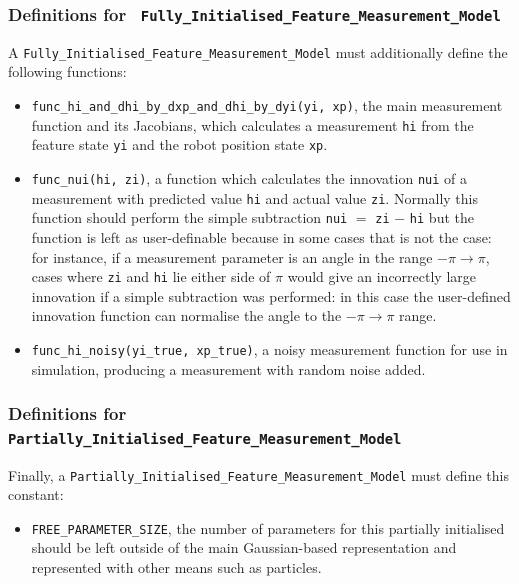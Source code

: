\documentclass{article}
\begin{document}
\subsubsection{Definitions for {\tt
    Fully\_Initialised\_Feature\_Measurement\_Model}}

A {\tt Fully\_Initialised\_Feature\_Measurement\_Model} must
additionally define the following functions: 
\begin{itemize}
\item {\tt func\_hi\_and\_dhi\_by\_dxp\_and\_dhi\_by\_dyi(yi, xp)},
  the main measurement function and its Jacobians, which calculates a
  measurement {\tt hi} from the feature state {\tt yi} and the robot
  position state {\tt xp}.
\item {\tt func\_nui(hi, zi)}, a function which calculates the
  innovation {\tt nui} of a measurement with predicted value {\tt hi}
  and actual value {\tt zi}. Normally this function should perform the
  simple subtraction {\tt nui} $=$ {\tt zi} $-$ {\tt hi} but the
  function is left as user-definable because in some cases that is not
  the case: for instance, if a measurement parameter is an angle in
  the range $-\pi \rightarrow \pi$, cases where {\tt zi} and {\tt hi}
  lie either side of $\pi$ would give an incorrectly large innovation
  if a simple subtraction was performed: in this case the user-defined
  innovation function can normalise the angle to the $-\pi \rightarrow
  \pi$ range.
\item {\tt func\_hi\_noisy(yi\_true, xp\_true)}, a noisy measurement
  function for use in simulation, producing a measurement with random
  noise added.
\end{itemize}


\subsubsection{Definitions for {\tt
    Partially\_Initialised\_Feature\_Measurement\_Model}}

Finally, a {\tt Partially\_Initialised\_Feature\_Measurement\_Model}
must define this constant:
\begin{itemize}
\item {\tt FREE\_PARAMETER\_SIZE}, the number of parameters for this
  partially initialised should be left outside of the main
  Gaussian-based representation and represented with other means such as
  particles.
\end{itemize}
\end{document}
